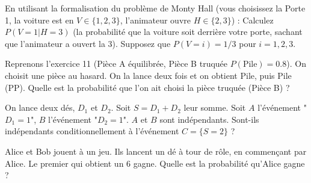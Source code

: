 \begin{exercicebox}
En utilisant la formalisation du problème de Monty Hall (vous choisissez la Porte 1, la voiture est en $V \in \{1, 2, 3\}$, l'animateur ouvre $H \in \{2, 3\}$) :
Calculez $P(V=1 | H=3)$ (la probabilité que la voiture soit derrière votre porte, sachant que l'animateur a ouvert la 3). Supposez que $P(V=i)=1/3$ pour $i=1,2,3$.
\end{exercicebox}

\begin{exercicebox}
Reprenons l'exercice 11 (Pièce A équilibrée, Pièce B truquée $P(\text{Pile})=0.8$).
On choisit une pièce au hasard. On la lance deux fois et on obtient Pile, puis Pile (PP).
Quelle est la probabilité que l'on ait choisi la pièce truquée (Pièce B) ?
\end{exercicebox}

\begin{exercicebox}
On lance deux dés, $D_1$ et $D_2$. Soit $S = D_1 + D_2$ leur somme.
Soit $A$ l'événement "$D_1 = 1$", $B$ l'événement "$D_2 = 1$".
$A$ et $B$ sont indépendants. Sont-ils indépendants conditionnellement à l'événement $C = \{S = 2\}$ ?
\end{exercicebox}

\begin{exercicebox}
Alice et Bob jouent à un jeu. Ils lancent un dé à tour de rôle, en commençant par Alice. Le premier qui obtient un 6 gagne.
Quelle est la probabilité qu'Alice gagne ?
\end{exercicebox}